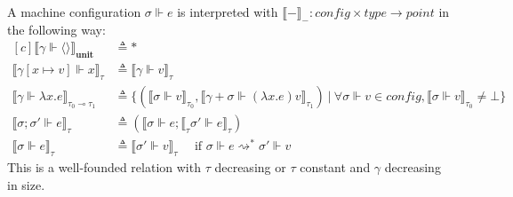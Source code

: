 \begin{definition}
  A machine configuration $\sigma \Vdash e$ is interpreted with $\llbracket -
  \rrbracket_{ - } : \textit{config} \times \textit{type} \to \textit{point}$
  in the following way:
  \begin{equation}
  \begin{aligned}[c]
  \llbracket \gamma \Vdash \langle \rangle \rrbracket_{\textbf{unit}}
  &\triangleq * \\
  \llbracket \gamma [x \mapsto v] \Vdash x \rrbracket_{\tau}
  &\triangleq \llbracket \gamma \Vdash v \rrbracket_{\tau} \\
  \llbracket \gamma \Vdash \lambda x . e \rrbracket_{\tau_0 \multimap \tau_1}
  &\triangleq \{ (\llbracket \sigma \Vdash v \rrbracket_{\tau_0}, \llbracket \gamma +
  \sigma \Vdash (\lambda x . e) v \rrbracket_{\tau_1}) \> | \> \forall \sigma \Vdash v
  \in \textit{config}, \llbracket \sigma \Vdash v \rrbracket_{\tau_0} \not= \bot \} \\
  \llbracket \sigma; \sigma' \Vdash e \rrbracket_{\tau} &\triangleq (\llbracket \sigma
  \Vdash e; \llbracket_{\tau} \sigma' \Vdash e \rrbracket_{\tau}) \\
  \llbracket \sigma \Vdash e \rrbracket_{\tau} &\triangleq \llbracket \sigma'
  \Vdash v\rrbracket_{\tau} \quad{\text{ if } \sigma \Vdash e
  \rightsquigarrow^* \sigma' \Vdash v}
  \end{aligned}
  \end{equation}
  This is a well-founded relation with $\tau$ decreasing or $\tau$ constant and
  $\gamma$ decreasing in size.
\end{definition}

